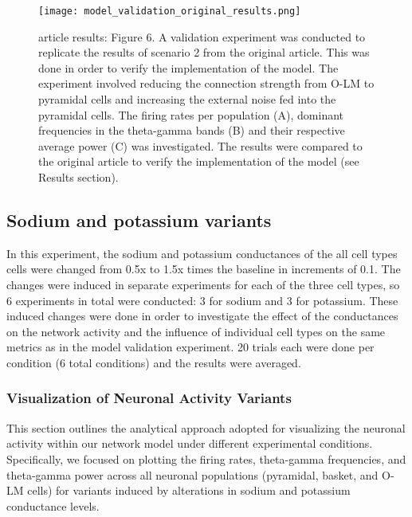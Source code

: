 \begin{figure}[htbp]
    \centering
    \texttt{[image: model\_validation\_original\_results.png]}
    \caption[\textcite{sanjayImpairedDendriticInhibition2015} article results]{\textcite{sanjayImpairedDendriticInhibition2015} article results: Figure 6.
        A validation experiment was conducted to replicate the results of scenario 2 from the original article.
        This was done in order to verify the implementation of the model. The experiment involved reducing the
        connection strength from O-LM to pyramidal cells and increasing the
        external noise fed into the pyramidal cells. The firing rates per population (A), dominant frequencies in the theta-gamma bands (B) and their respective average power (C) was investigated.
        The results were compared to the original article to verify the implementation of the model (see Results section).}\label{fig:validation_original_results}
\end{figure}

\subsection{Sodium and potassium variants}
In this experiment, the sodium and potassium conductances of the all cell types
cells were changed from 0.5x to 1.5x times the baseline in increments of 0.1.
The changes were induced in separate experiments for each of the three cell
types, so 6 experiments in total were conducted: 3 for sodium and 3 for
potassium. These induced changes were done in order to investigate the effect
of the conductances on the network activity and the influence of individual
cell types on the same metrics as in the model validation experiment. 20 trials
each were done per condition (6 total conditions) and the results were
averaged.

\subsubsection{Visualization of Neuronal Activity Variants}
This section outlines the analytical approach adopted for visualizing the
neuronal activity within our network model under different experimental
conditions. Specifically, we focused on plotting the firing rates, theta-gamma
frequencies, and theta-gamma power across all neuronal populations (pyramidal,
basket, and O-LM cells) for variants induced by alterations in sodium and
potassium conductance levels.

